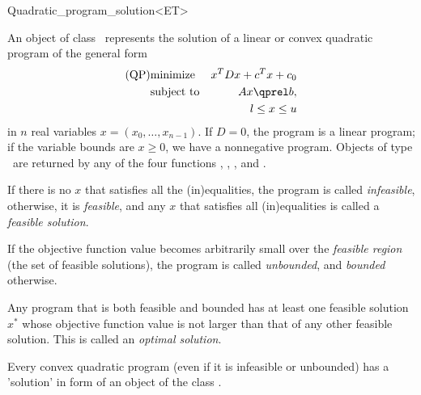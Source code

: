 \begin{ccRefClass}{Quadratic_program_solution<ET>}


\ccDefinition
An object of class \ccRefName\ represents the solution of a linear or 
convex quadratic program of the general form
\begin{eqnarray*}
\mbox{(QP)}& \mbox{minimize} & x^{T}Dx+c^{T}x+c_0 \\
&\mbox{subject to}   & Ax\qprel b, \\
&                    & l \leq x \leq u
\end{eqnarray*}
in $n$ real variables $x=(x_0,\ldots,x_{n-1})$. If $D=0$, the program is
a linear program; if the variable bounds are $x\geq 0$, we have a 
nonnegative program. Objects of type \ccRefName\ are returned by any of 
the four functions 
, ,
, and
. 

\ccExample
{}

If there is no $x$ that satisfies all the (in)equalities,
the program is called \emph{infeasible}, otherwise, it is \emph{feasible},
and any $x$ that satisfies all (in)equalities is called a \emph{feasible
solution}. 

If the objective function value becomes arbitrarily small over the
\emph{feasible region} (the set of feasible solutions), the program
is called \emph{unbounded}, and \emph{bounded} otherwise. 

Any program that is both feasible and bounded has at least one
feasible solution $x^*$ whose objective function value is not larger
than that of any other feasible solution. This is called an 
\emph{optimal solution}.

Every convex quadratic program (even if it is infeasible or unbounded)
has a 'solution' in form of an object of the class \ccRefName.

\ccTypes





\end{ccRefClass}

